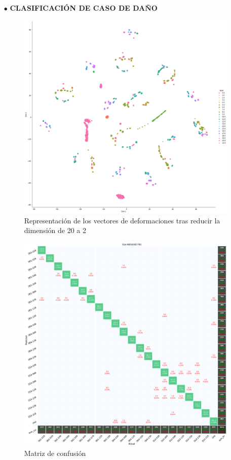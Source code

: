 \begin{itemize}
    \item[$\bullet$] \textbf{CLASIFICACIÓN DE CASO DE DAÑO}
    
    \begin{figure}[h!]
        \centering
        \includegraphics[width=150mm]{3/Fotos/Ty_Si_INESASSE_t-sne.png}
        \captionsetup{justification=centering,margin=1.25cm}
        \caption{Representación de los vectores de deformaciones tras reducir la dimensión de 20 a 2}
        \label{def_h}
    \end{figure}  
    
    \begin{figure}[h!]
        \centering
        \includegraphics[width=150mm]{3/Fotos/Ty_Si_INESASSE_confusion.png}
        \captionsetup{justification=centering,margin=1.25cm}
        \caption{Matriz de confusión}
        \label{def_h}
    \end{figure} 
    

\end{itemize}
